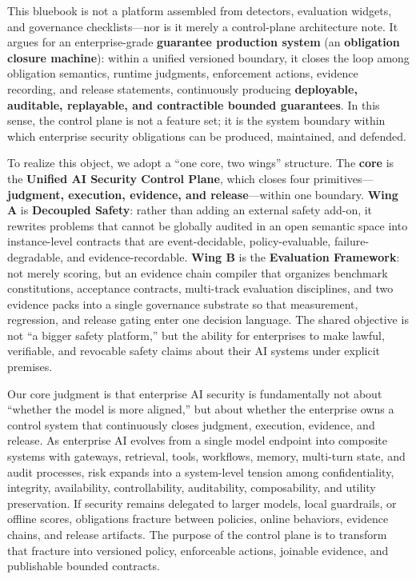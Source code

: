 \documentclass[11pt,a4paper]{report}
\begin{document}
\makebluebookfrontmatter

\begin{bluebookabstract}
This bluebook is not a platform assembled from detectors, evaluation widgets, and governance checklists—nor is it merely a control-plane architecture note. It argues for an enterprise-grade \textbf{guarantee production system} (an \textbf{obligation closure machine}): within a unified versioned boundary, it closes the loop among obligation semantics, runtime judgments, enforcement actions, evidence recording, and release statements, continuously producing \textbf{deployable, auditable, replayable, and contractible bounded guarantees}. In this sense, the control plane is not a feature set; it is the system boundary within which enterprise security obligations can be produced, maintained, and defended.

To realize this object, we adopt a “one core, two wings” structure. The \textbf{core} is the \textbf{Unified AI Security Control Plane}, which closes four primitives—\textbf{judgment, execution, evidence, and release}—within one boundary. \textbf{Wing A} is \textbf{Decoupled Safety}: rather than adding an external safety add-on, it rewrites problems that cannot be globally audited in an open semantic space into instance-level contracts that are event-decidable, policy-evaluable, failure-degradable, and evidence-recordable. \textbf{Wing B} is the \textbf{Evaluation Framework}: not merely scoring, but an evidence chain compiler that organizes benchmark constitutions, acceptance contracts, multi-track evaluation disciplines, and two evidence packs into a single governance substrate so that measurement, regression, and release gating enter one decision language. The shared objective is not “a bigger safety platform,” but the ability for enterprises to make lawful, verifiable, and revocable safety claims about their AI systems under explicit premises.

Our core judgment is that enterprise AI security is fundamentally not about “whether the model is more aligned,” but about whether the enterprise owns a control system that continuously closes judgment, execution, evidence, and release. As enterprise AI evolves from a single model endpoint into composite systems with gateways, retrieval, tools, workflows, memory, multi-turn state, and audit processes, risk expands into a system-level tension among confidentiality, integrity, availability, controllability, auditability, composability, and utility preservation. If security remains delegated to larger models, local guardrails, or offline scores, obligations fracture between policies, online behaviors, evidence chains, and release artifacts. The purpose of the control plane is to transform that fracture into versioned policy, enforceable actions, joinable evidence, and publishable bounded contracts.


\end{bluebookabstract}
\end{document}
